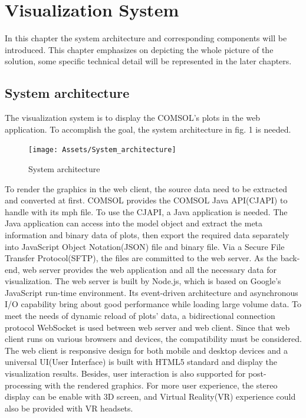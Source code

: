 \chapter{Visualization System}
In this chapter the system architecture and corresponding components will be introduced. This chapter emphasizes on depicting the whole picture of the solution, some specific technical detail will be represented in the later chapters.

\section{System architecture}

The visualization system is to display the COMSOL's plots in the web application. To accomplish the goal, the system architecture in fig. 1 is needed.

\begin{figure}[htb]
  \centering
  \texttt{[image: Assets/System\_architecture]}
  \caption{System architecture}
\end{figure}

To render the graphics in the web client, the source data need to be extracted and converted at first. COMSOL provides the COMSOL Java API(CJAPI) to handle with its mph file. To use the CJAPI, a Java application is needed. The Java application can access into the model object and extract the meta information and binary data of plots, then export the required data separately into JavaScript Object Notation(JSON) file and binary file. Via a Secure File Transfer Protocol(SFTP), the files are committed to the web server. As the back-end, web server provides the web application and all the necessary data for visualization. The web server is built by Node.js, which is based on Google's JavaScript run-time environment. Its event-driven architecture and asynchronous I/O capability bring about good performance while loading large volume data. To meet the needs of dynamic reload of plots' data, a bidirectional connection protocol WebSocket is used between web server and web client. Since that web client runs on various browsers and devices, the compatibility must be considered. The web client is responsive design for both mobile and desktop devices and a universal UI(User Interface) is built with HTML5 standard and display the visualization results. Besides, user interaction is also supported for post-processing with the rendered graphics. For more user experience, the stereo display can be enable with 3D screen, and Virtual Reality(VR) experience could also be provided with VR headsets.

